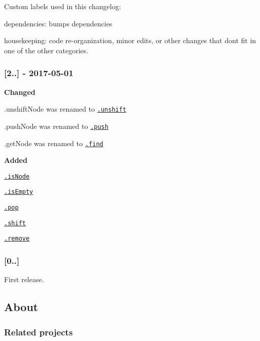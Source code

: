 Custom labels used in this changelog\+:


\begin{DoxyItemize}
\item {\ttfamily dependencies}\+: bumps dependencies
\item {\ttfamily housekeeping}\+: code re-\/organization, minor edits, or other changes that don\textquotesingle{}t fit in one of the other categories.
\end{DoxyItemize}

\subsubsection*{\mbox{[}2..\mbox{]} -\/ 2017-\/05-\/01}

{\bfseries Changed}


\begin{DoxyItemize}
\item {\ttfamily .unshift\+Node} was renamed to \href{#unshift}{\tt .unshift}
\item {\ttfamily .push\+Node} was renamed to \href{#push}{\tt .push}
\item {\ttfamily .get\+Node} was renamed to \href{#find}{\tt .find}
\end{DoxyItemize}

{\bfseries Added}


\begin{DoxyItemize}
\item \href{#isNode}{\tt .is\+Node}
\item \href{#isEmpty}{\tt .is\+Empty}
\item \href{#pop}{\tt .pop}
\item \href{#shift}{\tt .shift}
\item \href{#remove}{\tt .remove}
\end{DoxyItemize}

\subsubsection*{\mbox{[}0..\mbox{]}}

First release.

\subsection*{About}

\subsubsection*{Related projects}


